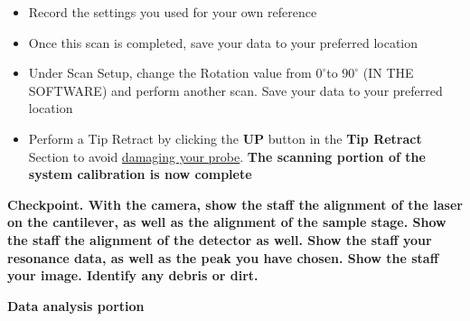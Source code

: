 \documentclass{../lab}
\begin{document}
\begin{enumerate}
    \begin{itemize}
        \item Record the settings you used for your own reference

        \item Once this scan is completed, save your data to your preferred location

        \item Under Scan Setup, change the Rotation value from $0^\circ$to $90^\circ$ (IN THE SOFTWARE) and perform another scan.  Save your data to your preferred location

        \item Perform a Tip Retract by clicking the \textbf{UP} button in the \textbf{Tip Retract} Section to avoid \hyperref[subsec:BrokenTip]{damaging your probe}. \textbf{The scanning portion of the system calibration is now complete }
    \end{itemize}

\end{enumerate}

\textbf{Checkpoint. With the camera, show the staff the alignment of the laser on the cantilever, as well as the alignment of the sample stage. Show the staff the alignment of the detector as well. Show the staff your resonance data, as well as the peak you have chosen. Show the staff your image. Identify any debris or dirt.}

\textbf{Data analysis portion}
\end{document}
